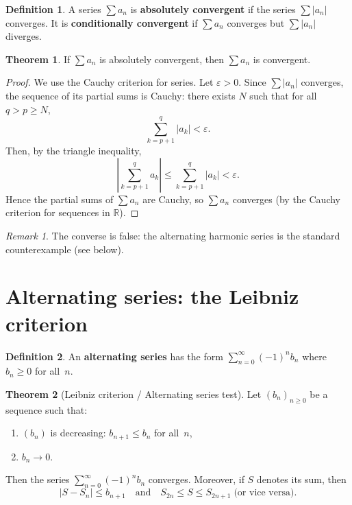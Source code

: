 \documentclass[12pt,a4paper,openany]{book}
\newcommand{\R}{\mathbb{R}}
\newcommand{\eps}{\varepsilon}
\newcommand{\abs}[1]{\left\lvert #1 \right\rvert}
\theoremstyle{definition}
\newtheorem{definition}{Definition}[chapter]
\newtheorem{theorem}{Theorem}[chapter]
\theoremstyle{remark}
\newtheorem{remark}{Remark}[chapter]
\begin{document}
\begin{definition}\label{def:absolute-convergence}
A series $\sum a_n$ is \textbf{absolutely convergent}
if the series $\sum \abs{a_n}$ converges. It is \textbf{conditionally convergent}
if $\sum a_n$ converges but $\sum \abs{a_n}$ diverges.
\end{definition}

\begin{theorem}\label{thm:abs-implies-conv}
If $\sum a_n$ is absolutely convergent, then $\sum a_n$ is convergent.
\end{theorem}

\begin{proof}
We use the Cauchy criterion for series. Let $\eps > 0$.
Since $\sum\abs{a_n}$ converges, the sequence of its partial sums is Cauchy:
there exists $N$ such that for all $q > p \geq N$,
\[
   \sum_{k=p+1}^{q}\abs{a_k} < \eps.
\]
Then, by the triangle inequality,
\[
   \abs{\sum_{k=p+1}^{q} a_k}
   \leq \sum_{k=p+1}^{q}\abs{a_k}
   < \eps.
\]
Hence the partial sums of $\sum a_n$ are Cauchy, so $\sum a_n$ converges
(by the Cauchy criterion for sequences in $\R$).
\end{proof}

\begin{remark}
The converse is false: the alternating harmonic series is the standard
counterexample (see below).
\end{remark}

\section{Alternating series: the Leibniz criterion}\label{sec:alternating}

\begin{definition}
An \textbf{alternating series} has the form $\sum_{n=0}^{\infty}(-1)^n b_n$
where $b_n \geq 0$ for all~$n$.
\end{definition}

\begin{theorem}[Leibniz criterion / Alternating series test]
\label{thm:leibniz}
Let $(b_n)_{n\geq 0}$ be a sequence such that:
\begin{enumerate}
\item $(b_n)$ is decreasing: $b_{n+1} \leq b_n$ for all~$n$,
\item $b_n \to 0$.
\end{enumerate}
Then the series $\sum_{n=0}^{\infty}(-1)^n b_n$ converges. Moreover, if $S$
denotes its sum, then
\[
   \abs{S - S_n} \leq b_{n+1}
   \quad\text{and}\quad
   S_{2n} \leq S \leq S_{2n+1} \;\text{(or vice versa)}.
\]
\end{theorem}
\end{document}
